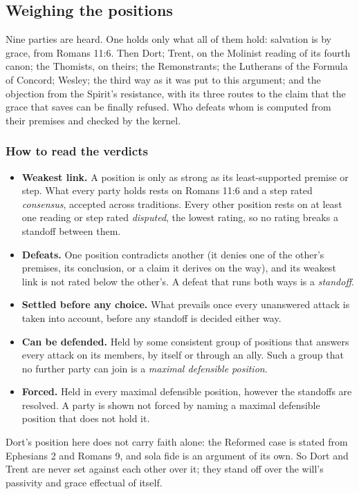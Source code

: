 \documentclass[11pt]{article}
\begin{document}
\subsection*{Weighing the positions}
Nine parties are heard. One holds only what all of them hold: salvation is by grace, from Romans 11:6. Then Dort; Trent, on the Molinist reading of its fourth canon; the Thomists, on theirs; the Remonstrants; the Lutherans of the Formula of Concord; Wesley; the third way as it was put to this argument; and the objection from the Spirit’s resistance, with its three routes to the claim that the grace that saves can be finally refused. Who defeats whom is computed from their premises and checked by the kernel.

\subsubsection*{How to read the verdicts}
\begin{itemize}
  \item \textbf{Weakest link.} A position is only as strong as its least-supported premise or step. What every party holds rests on Romans 11:6 and a step rated \emph{consensus}, accepted across traditions. Every other position rests on at least one reading or step rated \emph{disputed}, the lowest rating, so no rating breaks a standoff between them.
  \item \textbf{Defeats.} One position contradicts another (it denies one of the other’s premises, its conclusion, or a claim it derives on the way), and its weakest link is not rated below the other’s. A defeat that runs both ways is a \emph{standoff}.
  \item \textbf{Settled before any choice.} What prevails once every unanswered attack is taken into account, before any standoff is decided either way.
  \item \textbf{Can be defended.} Held by some consistent group of positions that answers every attack on its members, by itself or through an ally. Such a group that no further party can join is a \emph{maximal defensible position}.
  \item \textbf{Forced.} Held in every maximal defensible position, however the standoffs are resolved. A party is shown not forced by naming a maximal defensible position that does not hold it.
\end{itemize}
Dort’s position here does not carry faith alone: the Reformed case is stated from Ephesians 2 and Romans 9, and sola fide is an argument of its own. So Dort and Trent are never set against each other over it; they stand off over the will’s passivity and grace effectual of itself.
\end{document}
